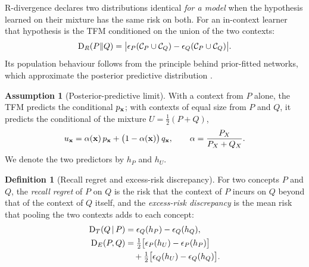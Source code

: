 \documentclass[11pt]{article}
\theoremstyle{plain}
\theoremstyle{definition}
\newtheorem{definition}{Definition}
\newtheorem{assumption}{Assumption}
\theoremstyle{remark}
\begin{document}
R-divergence \citep{zhao2023rdiv} declares two distributions identical \emph{for a model} when the hypothesis learned
on their mixture has the same risk on both. For an in-context learner that hypothesis is the TFM conditioned on the
union of the two contexts:
\begin{equation}\label{eq:rdiv}
  \mathrm{D}_R(P\|Q)=\bigl|\epsilon_P(\mathcal{C}_P\cup\mathcal{C}_Q)-\epsilon_Q(\mathcal{C}_P\cup\mathcal{C}_Q)\bigr| .
\end{equation}
Its population behaviour follows from the principle behind prior-fitted networks, which approximate the posterior
predictive distribution \citep{muller2022pfn,nagler2023statistical}.

\begin{assumption}[Posterior-predictive limit]\label{ass:ppd}
With a context from $P$ alone, the TFM predicts the conditional $p_{\mathbf{x}}$; with contexts of equal size from $P$ and
$Q$, it predicts the conditional of the mixture $U=\tfrac12(P+Q)$,
\[
  u_{\mathbf{x}}=\alpha(\mathbf{x})\,p_{\mathbf{x}}+\bigl(1-\alpha(\mathbf{x})\bigr)\,q_{\mathbf{x}},\qquad \alpha=\frac{P_X}{P_X+Q_X}.
\]
We denote the two predictors by $h_P$ and $h_U$.
\end{assumption}

\begin{definition}[Recall regret and excess-risk discrepancy]\label{def:excess}
For two concepts $P$ and $Q$, the \emph{recall regret} of $P$ on $Q$ is the risk that the context of $P$ incurs on
$Q$ beyond that of the context of $Q$ itself, and the \emph{excess-risk discrepancy} is the mean risk that pooling
the two contexts adds to each concept:
\begin{align}
  \mathrm{D}_T(Q\,|\,P) &= \epsilon_Q(h_P)-\epsilon_Q(h_Q), \label{eq:transfer}\\
  \mathrm{D}_E(P,Q) &= \tfrac12\bigl[\epsilon_P(h_U)-\epsilon_P(h_P)\bigr] \notag\\
              &\quad+\tfrac12\bigl[\epsilon_Q(h_U)-\epsilon_Q(h_Q)\bigr].
  \label{eq:excess}
\end{align}
\end{definition}
\end{document}
